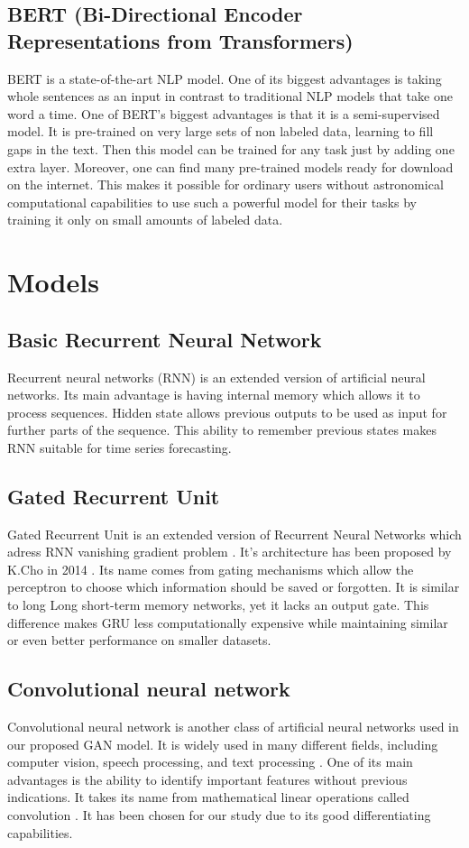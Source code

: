 \documentclass[11pt]{article} %
\begin{document}
\subsection{BERT (Bi-Directional Encoder Representations from Transformers)}
BERT is a state-of-the-art NLP model. One of its biggest advantages is taking whole sentences as an input in contrast to traditional NLP models that take one word a time. One of BERT's biggest advantages is that it is a semi-supervised model. It is pre-trained on very large sets of non labeled data, learning to fill gaps in the text. Then this model can be trained for any task just by adding one extra layer. Moreover, one can find many pre-trained models ready for download on the internet. This makes it possible for ordinary users without astronomical computational capabilities to use such a powerful model for their tasks by training it only on small amounts of labeled data. 

\section{Models}

\subsection{Basic Recurrent Neural Network}
Recurrent neural networks (RNN) is an extended version of artificial neural networks. Its main advantage is having internal memory which allows it to process sequences. Hidden state allows previous outputs to be used as input for further parts of the sequence. This ability to remember previous states makes RNN suitable for time series forecasting. 

\subsection{Gated Recurrent Unit}
Gated Recurrent Unit is an extended version of Recurrent Neural Networks which adress RNN vanishing gradient problem \cite{gru2}.
It's architecture has been proposed by K.Cho in 2014 \cite{gru3}. Its name comes from gating mechanisms which allow the perceptron to choose which information should be saved or forgotten. It is similar to long Long short-term memory networks, yet it lacks an output gate. This difference makes GRU less computationally expensive while maintaining similar or even better performance on smaller datasets. 

\subsection{Convolutional neural network}
Convolutional neural network is another class of artificial neural networks used in our proposed GAN model. It is widely used in many different fields, including computer vision, speech processing, and text processing \cite{cnn1}. One of its main advantages is the ability to identify important features without previous indications. It takes its name from mathematical linear operations called convolution \cite{cnn2}. It has been chosen for our study due to its good differentiating capabilities.
\end{document}
